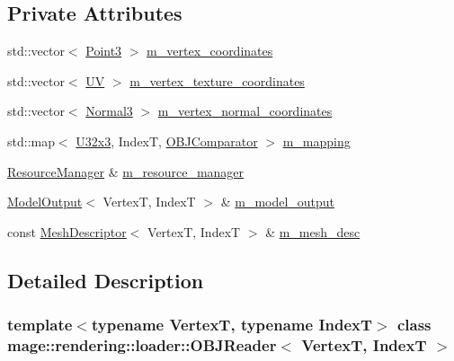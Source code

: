 \subsection*{Private Attributes}
\begin{DoxyCompactItemize}
\item 
std\+::vector$<$ \hyperlink{structmage_1_1_point3}{Point3} $>$ \hyperlink{classmage_1_1rendering_1_1loader_1_1_o_b_j_reader_a393e0932f169a786e38f120fc6f0d84b}{m\+\_\+vertex\+\_\+coordinates}
\item 
std\+::vector$<$ \hyperlink{structmage_1_1_u_v}{UV} $>$ \hyperlink{classmage_1_1rendering_1_1loader_1_1_o_b_j_reader_aed919290e638cbe00a9144fdcb652178}{m\+\_\+vertex\+\_\+texture\+\_\+coordinates}
\item 
std\+::vector$<$ \hyperlink{structmage_1_1_normal3}{Normal3} $>$ \hyperlink{classmage_1_1rendering_1_1loader_1_1_o_b_j_reader_ac977ade8154bef446524526e8297f3eb}{m\+\_\+vertex\+\_\+normal\+\_\+coordinates}
\item 
std\+::map$<$ \hyperlink{namespacemage_ab3633c193f686845fcf80ce95d18a20b}{U32x3}, IndexT, \hyperlink{structmage_1_1rendering_1_1loader_1_1_o_b_j_reader_1_1_o_b_j_comparator}{O\+B\+J\+Comparator} $>$ \hyperlink{classmage_1_1rendering_1_1loader_1_1_o_b_j_reader_a4bad8aafabddb5cec68be8357d2d7566}{m\+\_\+mapping}
\item 
\hyperlink{classmage_1_1rendering_1_1_resource_manager}{Resource\+Manager} \& \hyperlink{classmage_1_1rendering_1_1loader_1_1_o_b_j_reader_ae6208964e05f3e93eb9939942fe3b55c}{m\+\_\+resource\+\_\+manager}
\item 
\hyperlink{structmage_1_1rendering_1_1_model_output}{Model\+Output}$<$ VertexT, IndexT $>$ \& \hyperlink{classmage_1_1rendering_1_1loader_1_1_o_b_j_reader_a645fca7c3f7f9860cb879f4088c4f8fc}{m\+\_\+model\+\_\+output}
\item 
const \hyperlink{classmage_1_1rendering_1_1_mesh_descriptor}{Mesh\+Descriptor}$<$ VertexT, IndexT $>$ \& \hyperlink{classmage_1_1rendering_1_1loader_1_1_o_b_j_reader_aa029c035456ea9456d63726b15e5db05}{m\+\_\+mesh\+\_\+desc}
\end{DoxyCompactItemize}


\subsection{Detailed Description}
\subsubsection*{template$<$typename VertexT, typename IndexT$>$\newline
class mage\+::rendering\+::loader\+::\+O\+B\+J\+Reader$<$ Vertex\+T, Index\+T $>$}

